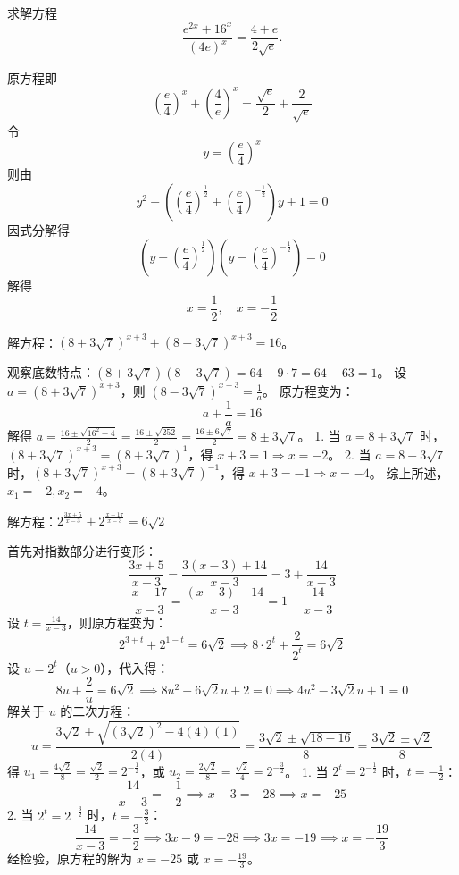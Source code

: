 \begin{questions}
    \question 求解方程
    \[
    \frac{e^{2x}+16^x}{(4e)^x} = \frac{4+e}{2\sqrt{e}}.
    \]
    \begin{solution}
        原方程即
        \[
        \left(\frac{e}{4}\right)^x + \left(\frac{4}{e}\right)^x = \frac{\sqrt{e}}{2} + \frac{2}{\sqrt{e}}
        \]
        令
        \[
        y = \left(\frac{e}{4}\right)^x
        \]
        则由
        \[
        y^2 - \left(\left(\frac{e}{4}\right)^{\frac{1}{2}} + \left(\frac{e}{4}\right)^{-\frac{1}{2}}\right)y + 1 = 0
        \]
        因式分解得
        \[
        \left(y - \left(\frac{e}{4}\right)^{\frac{1}{2}}\right)\left(y - \left(\frac{e}{4}\right)^{-\frac{1}{2}}\right) = 0
        \]
        解得
        \[
        x = \frac{1}{2}, \quad x = -\frac{1}{2}
        \]
    \end{solution}

    \question 解方程：$(8 + 3\sqrt{7})^{x+3} + (8 - 3\sqrt{7})^{x+3} = 16$。

\begin{solution}
观察底数特点：$(8 + 3\sqrt{7})(8 - 3\sqrt{7}) = 64 - 9 \cdot 7 = 64 - 63 = 1$。
设 $a = (8 + 3\sqrt{7})^{x+3}$，则 $(8 - 3\sqrt{7})^{x+3} = \frac{1}{a}$。
原方程变为：
\[
a + \frac{1}{a} = 16
\]
解得 $a = \frac{16 \pm \sqrt{16^2 - 4}}{2} = \frac{16 \pm \sqrt{252}}{2} = \frac{16 \pm 6\sqrt{7}}{2} = 8 \pm 3\sqrt{7}$。
1. 当 $a = 8 + 3\sqrt{7}$ 时，$(8 + 3\sqrt{7})^{x+3} = (8 + 3\sqrt{7})^1$，得 $x + 3 = 1 \Rightarrow x = -2$。
2. 当 $a = 8 - 3\sqrt{7}$ 时，$(8 + 3\sqrt{7})^{x+3} = (8 + 3\sqrt{7})^{-1}$，得 $x + 3 = -1 \Rightarrow x = -4$。
综上所述，$x_1 = -2, x_2 = -4$。
\end{solution}

\question
解方程：$2^{\frac{3x + 5}{x - 3}} + 2^{\frac{x - 17}{x - 3}} = 6\sqrt{2}$

\begin{solution}
首先对指数部分进行变形：
\[
\frac{3x + 5}{x - 3} = \frac{3(x - 3) + 14}{x - 3} = 3 + \frac{14}{x - 3}
\]
\[
\frac{x - 17}{x - 3} = \frac{(x - 3) - 14}{x - 3} = 1 - \frac{14}{x - 3}
\]
设 $t = \frac{14}{x - 3}$，则原方程变为：
\[
2^{3 + t} + 2^{1 - t} = 6\sqrt{2} \implies 8 \cdot 2^t + \frac{2}{2^t} = 6\sqrt{2}
\]
设 $u = 2^t$（$u > 0$），代入得：
\[
8u + \frac{2}{u} = 6\sqrt{2} \implies 8u^2 - 6\sqrt{2}u + 2 = 0 \implies 4u^2 - 3\sqrt{2}u + 1 = 0
\]
解关于 $u$ 的二次方程：
\[
u = \frac{3\sqrt{2} \pm \sqrt{(3\sqrt{2})^2 - 4(4)(1)}}{2(4)} = \frac{3\sqrt{2} \pm \sqrt{18 - 16}}{8} = \frac{3\sqrt{2} \pm \sqrt{2}}{8}
\]
得 $u_1 = \frac{4\sqrt{2}}{8} = \frac{\sqrt{2}}{2} = 2^{-\frac{1}{2}}$，或 $u_2 = \frac{2\sqrt{2}}{8} = \frac{\sqrt{2}}{4} = 2^{-\frac{3}{2}}$。
1. 当 $2^t = 2^{-\frac{1}{2}}$ 时，$t = -\frac{1}{2}$：
\[
\frac{14}{x - 3} = -\frac{1}{2} \implies x - 3 = -28 \implies x = -25
\]
2. 当 $2^t = 2^{-\frac{3}{2}}$ 时，$t = -\frac{3}{2}$：
\[
\frac{14}{x - 3} = -\frac{3}{2} \implies 3x - 9 = -28 \implies 3x = -19 \implies x = -\frac{19}{3}
\]
经检验，原方程的解为 $x = -25$ 或 $x = -\frac{19}{3}$。
\end{solution}


\end{questions}
